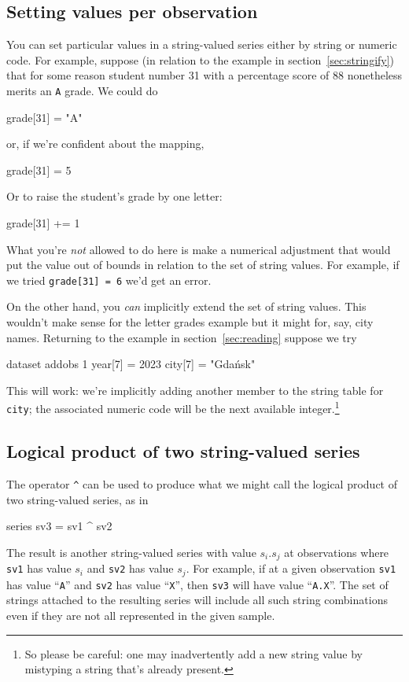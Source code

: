 \subsection{Setting values per observation}

You can set particular values in a string-valued series either by
string or numeric code. For example, suppose (in relation to the
example in section~\ref{sec:stringify}) that for some reason student
number 31 with a percentage score of 88 nonetheless merits an
\texttt{A} grade. We could do
\begin{code}
grade[31] = "A"
\end{code}
or, if we're confident about the mapping,
\begin{code}
grade[31] = 5
\end{code}
Or to raise the student's grade by one letter:
\begin{code}
grade[31] += 1
\end{code}

What you're \textit{not} allowed to do here is make a numerical
adjustment that would put the value out of bounds in relation to the
set of string values. For example, if we tried \texttt{grade[31] = 6}
we'd get an error.

On the other hand, you \textit{can} implicitly extend the set of
string values. This wouldn't make sense for the letter grades example
but it might for, say, city names. Returning to the example in
section~\ref{sec:reading} suppose we try
%
\begin{code}
dataset addobs 1
year[7] = 2023
city[7] = "Gdańsk"
\end{code}
%
This will work: we're implicitly adding another member to the string
table for \texttt{city}; the associated numeric code will be the next
available integer.\footnote{So please be careful: one may
  inadvertently add a new string value by mistyping a string that's
  already present.}

\subsection{Logical product of two string-valued series}

The operator \verb|^| can be used to produce what we might call the
logical product of two string-valued series, as in
\begin{code}
series sv3 = sv1 ^ sv2
\end{code}
The result is another string-valued series with value $s_i.s_j$ at
observations where \texttt{sv1} has value $s_i$ and \texttt{sv2} has
value $s_j$. For example, if at a given observation \texttt{sv1} has
value ``\texttt{A}'' and \texttt{sv2} has value ``\texttt{X}'', then
\texttt{sv3} will have value ``\texttt{A.X}''. The set of strings
attached to the resulting series will include all such string
combinations even if they are not all represented in the given sample.

